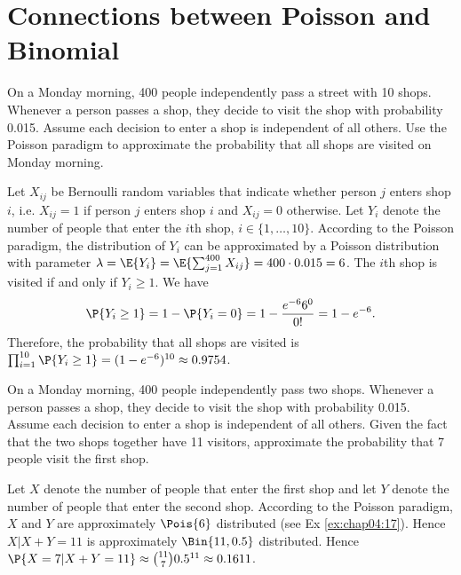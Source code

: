 \section{Connections between Poisson and Binomial}
\label{sec:section-4.6}

\begin{exercise}\label{ex:chap04:17}
	On a Monday morning, 400 people independently pass a street with 10 shops. Whenever a person passes a shop, they decide to visit the shop with probability 0.015. Assume each decision to enter a shop is independent of all others. Use the Poisson paradigm to approximate the probability that all shops are visited on Monday morning.
	\begin{solution}
		Let $X_{ij}$ be Bernoulli random variables that indicate whether person $j$ enters shop $i$, i.e. $X_{ij} = 1$ if person $j$ enters shop $i$ and $X_{ij} = 0$ otherwise. Let $Y_i$ denote the number of people that enter the $i$th shop, $i \in \{1, \hdots, 10\}$. According to the Poisson paradigm, the distribution of $Y_i$ can be approximated by a Poisson distribution with parameter $\lambda = \E{Y_i} = \E{\sum_{j = 1}^{400} X_{ij}} = 400 \cdot 0.015 = 6$. The $i$th shop is visited if and only if $Y_i \geq 1$. We have
		\begin{equation*}
			\P{Y_i \geq 1} = 1 - \P{Y_i = 0} = 1 - \frac{e^{-6} 6^0}{0!} = 1 - e^{-6}.
		\end{equation*}
		Therefore, the probability that all shops are visited is $\prod_{i = 1}^{10} \P{Y_i \geq 1} = (1 - e^{-6})^{10} \approx 0.9754$.
	\end{solution}
\end{exercise}

\begin{exercise}
	On a Monday morning, 400 people independently pass two shops. Whenever a person passes a shop, they decide to visit the shop with probability 0.015. Assume each decision to enter a shop is independent of all others. Given the fact that the two shops together have 11 visitors, approximate the probability that 7 people visit the first shop.
	\begin{solution}
		Let $X$ denote the number of people that enter the first shop and let $Y$ denote the number of people that enter the second shop. According to the Poisson paradigm, $X$ and $Y$ are approximately $\Pois{6}$ distributed (see Ex \ref{ex:chap04:17}). Hence $X | X + Y = 11$ is approximately $\Bin{11, 0.5}$ distributed. Hence $\P{X = 7| X + Y = 11} \approx \binom{11}{7} 0.5^{11} \approx 0.1611$.
	\end{solution}
\end{exercise}

